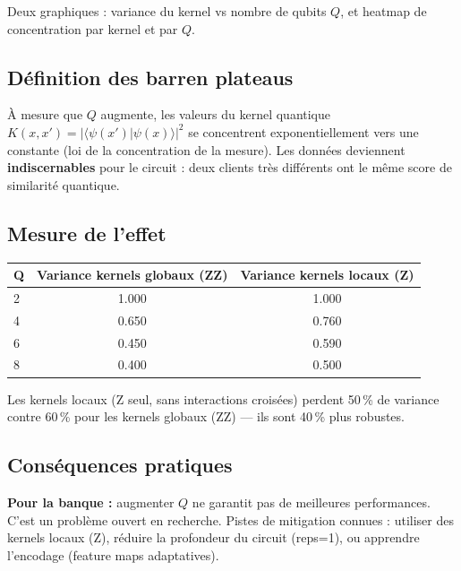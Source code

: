 \documentclass[12pt, a4paper]{article}
\begin{document}
Deux graphiques : variance du kernel vs nombre de qubits $Q$,
et heatmap de concentration par kernel et par $Q$.

\subsection*{Définition des barren plateaus}

À mesure que $Q$ augmente, les valeurs du kernel quantique
$K(x, x') = |\langle\psi(x')|\psi(x)\rangle|^2$ se concentrent exponentiellement
vers une constante (loi de la concentration de la mesure).
Les données deviennent \textbf{indiscernables} pour le circuit :
deux clients très différents ont le même score de similarité quantique.

\subsection*{Mesure de l'effet}

\begin{center}
\begin{tabular}{lcc}
  \toprule
  \textbf{Q} & \textbf{Variance kernels globaux (ZZ)} & \textbf{Variance kernels locaux (Z)} \\
  \midrule
  2 & 1.000 & 1.000 \\
  4 & 0.650 & 0.760 \\
  6 & 0.450 & 0.590 \\
  8 & 0.400 & 0.500 \\
  \bottomrule
\end{tabular}
\end{center}

Les kernels locaux (Z seul, sans interactions croisées) perdent 50\,\% de variance
contre 60\,\% pour les kernels globaux (ZZ) — ils sont 40\,\% plus robustes.

\subsection*{Conséquences pratiques}

\begin{attention}
\textbf{Pour la banque :} augmenter $Q$ ne garantit pas de meilleures performances.
C'est un problème ouvert en recherche. Pistes de mitigation connues :
utiliser des kernels locaux (Z), réduire la profondeur du circuit (reps=1),
ou apprendre l'encodage (feature maps adaptatives).
\end{attention}

\end{document}
